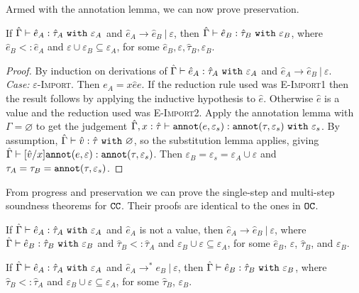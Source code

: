 Armed with the annotation lemma, we can now prove preservation.


\begin{theorem}
If $\hat \Gamma \vdash \hat e_A: \hat \tau_A~\mathtt{with}~ \varepsilon_A$ and $\hat e_A \longrightarrow \hat e_B~|~\varepsilon$, then $\hat \Gamma \vdash \hat e_B: \hat \tau_B~\mathtt{with}~ \varepsilon_B$, where $\hat e_B <: \hat e_A$ and $\varepsilon \cup \varepsilon_B \subseteq \varepsilon_A$, for some $\hat e_B, \varepsilon, \hat \tau_B, \varepsilon_B$.
\end{theorem}

\begin{proof} By induction on derivations of $\hat \Gamma \vdash \hat e_A: \hat \tau_A~\mathtt{with}~ \varepsilon_A$ and $\hat e_A \longrightarrow \hat e_B~|~\varepsilon$. \\

\textit{Case:} \textsc{$\varepsilon$-Import}. Then $e_A = {x}{\hat e}{e}$. If the reduction rule used was \textsc{E-Import1} then the result follows by applying the inductive hypothesis to $\hat e$. Otherwise $\hat e$ is a value and the reduction used was \textsc{E-Import2}. Apply the annotation lemma with $\Gamma = \varnothing$ to get the judgement $\hat \Gamma, x: \hat \tau \vdash \mathtt{annot}(e, \varepsilon_s): \mathtt{annot}(\tau, \varepsilon_s)~\mathtt{with}~ \varepsilon_s$. By assumption, $\hat \Gamma \vdash \hat v: \hat \tau~\mathtt{with}~ \varnothing$, so the substitution lemma applies, giving $\hat \Gamma \vdash [\hat v/x]\mathtt{annot}(e, \varepsilon): \mathtt{annot}(\tau, \varepsilon_s)$. Then $\varepsilon_B = \varepsilon_s = \varepsilon_A \cup \varepsilon$ and $\tau_A = \tau_B = \mathtt{annot}(\tau, \varepsilon_s)$.
\end{proof}

From progress and preservation we can prove the single-step and multi-step soundness theorems for $\mathtt{CC}$. Their proofs are identical to the ones in $\mathtt{OC}$.

\begin{theorem}
If $\hat \Gamma \vdash \hat e_A: \hat \tau_A~\mathtt{with}~ \varepsilon_A$ and $\hat e_A$ is not a value, then $\hat e_A \longrightarrow \hat e_B~|~\varepsilon$, where $\hat \Gamma \vdash \hat e_B: \hat \tau_B~\mathtt{with}~ \varepsilon_B$ and $\hat \tau_B <: \hat \tau_A$ and $\varepsilon_B \cup \varepsilon \subseteq \varepsilon_A$, for some $\hat e_B$, $\varepsilon$, $\hat \tau_B$, and $\varepsilon_B$.
\end{theorem}

\begin{theorem}
If $\hat \Gamma \vdash \hat e_A: \hat \tau_A~\mathtt{with}~ \varepsilon_A$ and $\hat e_A \longrightarrow^{*} e_B~|~\varepsilon$, then $\hat \Gamma \vdash \hat e_B: \hat \tau_B~\mathtt{with}~ \varepsilon_B$, where $\hat \tau_B <: \hat \tau_A$ and $\varepsilon_B \cup \varepsilon \subseteq \varepsilon_A$, for some $\hat \tau_B$, $\varepsilon_B$.
\end{theorem}